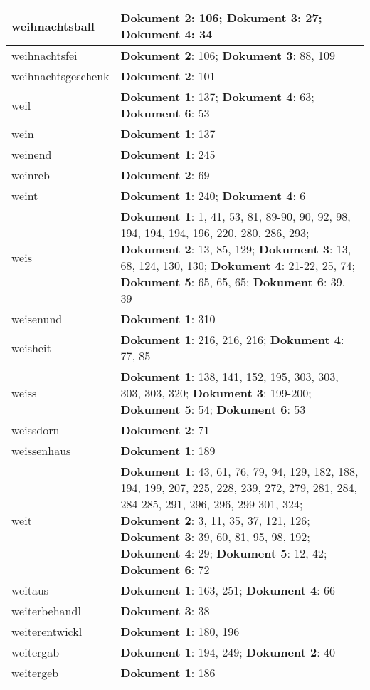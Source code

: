 \documentclass[a5paper]{article}
\begin{document}
\begin{longtable}[l]{|l|p{3in}|}
weihnachtsball & \textbf{Dokument 2}: 106; \textbf{Dokument 3}: 27; \textbf{Dokument 4}: 34 \\
\hline
weihnachtsfei & \textbf{Dokument 2}: 106; \textbf{Dokument 3}: 88, 109 \\
\hline
weihnachtsgeschenk & \textbf{Dokument 2}: 101 \\
\hline
weil & \textbf{Dokument 1}: 137; \textbf{Dokument 4}: 63; \textbf{Dokument 6}: 53 \\
\hline
wein & \textbf{Dokument 1}: 137 \\
\hline
weinend & \textbf{Dokument 1}: 245 \\
\hline
weinreb & \textbf{Dokument 2}: 69 \\
\hline
weint & \textbf{Dokument 1}: 240; \textbf{Dokument 4}: 6 \\
\hline
weis & \textbf{Dokument 1}: 1, 41, 53, 81, 89-90, 90, 92, 98, 194, 194, 194, 196, 220, 280, 286, 293; \textbf{Dokument 2}: 13, 85, 129; \textbf{Dokument 3}: 13, 68, 124, 130, 130; \textbf{Dokument 4}: 21-22, 25, 74; \textbf{Dokument 5}: 65, 65, 65; \textbf{Dokument 6}: 39, 39 \\
\hline
weisenund & \textbf{Dokument 1}: 310 \\
\hline
weisheit & \textbf{Dokument 1}: 216, 216, 216; \textbf{Dokument 4}: 77, 85 \\
\hline
weiss & \textbf{Dokument 1}: 138, 141, 152, 195, 303, 303, 303, 303, 320; \textbf{Dokument 3}: 199-200; \textbf{Dokument 5}: 54; \textbf{Dokument 6}: 53 \\
\hline
weissdorn & \textbf{Dokument 2}: 71 \\
\hline
weissenhaus & \textbf{Dokument 1}: 189 \\
\hline
weit & \textbf{Dokument 1}: 43, 61, 76, 79, 94, 129, 182, 188, 194, 199, 207, 225, 228, 239, 272, 279, 281, 284, 284-285, 291, 296, 296, 299-301, 324; \textbf{Dokument 2}: 3, 11, 35, 37, 121, 126; \textbf{Dokument 3}: 39, 60, 81, 95, 98, 192; \textbf{Dokument 4}: 29; \textbf{Dokument 5}: 12, 42; \textbf{Dokument 6}: 72 \\
\hline
weitaus & \textbf{Dokument 1}: 163, 251; \textbf{Dokument 4}: 66 \\
\hline
weiterbehandl & \textbf{Dokument 3}: 38 \\
\hline
weiterentwickl & \textbf{Dokument 1}: 180, 196 \\
\hline
weitergab & \textbf{Dokument 1}: 194, 249; \textbf{Dokument 2}: 40 \\
\hline
weitergeb & \textbf{Dokument 1}: 186 \\

\end{longtable}
\end{document}
